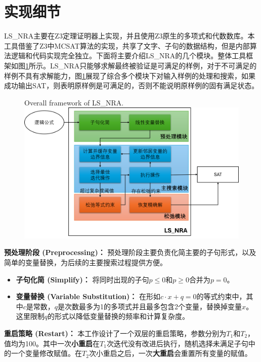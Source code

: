 \section{实现细节}
LS\_NRA主要在Z3定理证明器上实现，并且使用Z3原生的多项式和代数数库。本工具借鉴了Z3中MCSAT算法的实现，共享了文字、子句的数据结构，但是内部算法逻辑和代码实现完全独立。下面将主要介绍LS\_NRA的几个模块。整体工具框架如图\ref{fig:total}所示。LS\_NRA只能够求解最终被验证是可满足的样例，对于不可满足的样例不具有求解能力，图\ref{fig:total}展现了综合多个模块下对输入样例的处理和搜索，如果成功输出SAT，则表明原样例是可满足的，否则不能说明原样例的固有满足状态。

\begin{figure}[]
    \centering
     {Overall framework of LS\_NRA.}
    \includegraphics[width=0.9\columnwidth]{Img/structure.png}
    \label{fig:total}
\end{figure}

\textbf{预处理阶段 (Preprocessing)：} 预处理阶段主要负责化简主要的子句形式，以及简单的变量替换，为后续的主要搜索过程提供方便。
\begin{itemize}
    \item \textbf{子句化简 (Simplify)：} 将同时出现的子句$p \le 0$和$p \ge 0$合并为$p = 0$。
    \item \textbf{变量替换 (Variable Substitution)：} 在形如$c \cdot x + q = 0$的等式约束中，其中$c$是常数，$q$是次数最多为1的多项式并且最多包含2个变量，替换掉变量$x$。这里限制$q$的形式以降低变量替换的频率和计算复杂度。
\end{itemize}

\textbf{重启策略 (Restart)：} 本工作设计了一个双层的重启策略，参数分别为$T_1$和$T_2$，值均为100。其中一次\textbf{小重启}在$T_1$次迭代没有改进后执行，随机选择未满足子句中的一个变量修改赋值。在$T_2$次小重启之后，一次\textbf{大重启}会重置所有变量的赋值。


